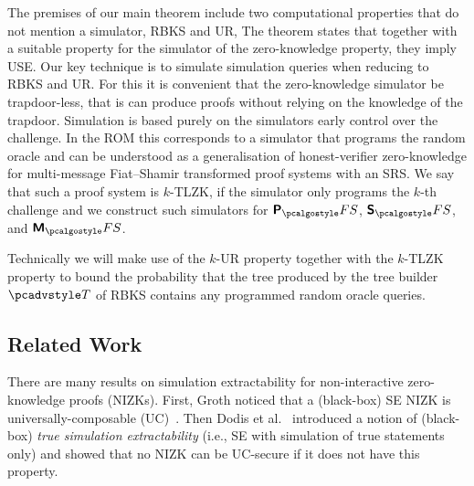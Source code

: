 The premises of our main theorem include two computational properties that do not mention a simulator, RBKS and UR, The theorem states that together with a suitable property for the simulator of the zero-knowledge property, they imply USE.
%
Our key technique is to simulate simulation queries when reducing to RBKS and UR. For this it is convenient that the zero-knowledge simulator be trapdoor-less, that is can produce proofs without relying on the
knowledge of the trapdoor. Simulation is based purely on the simulators early control over the challenge. 
%
In the ROM this corresponds to a simulator that programs the random oracle and can be understood as a generalisation of
honest-verifier zero-knowledge for multi-message Fiat--Shamir transformed proof systems with an
SRS. We say that such a proof system is $k$-TLZK, if the simulator only programs the $k$-th challenge and we construct such simulators for $\plonkprotfs$, $\sonicprotfs$, and $\marlinprotfs$. 





Technically we will make use of the $k$-UR property together with the $k$-TLZK property to bound the probability that the tree produced by the tree builder $\tdv$ of RBKS contains any programmed random oracle queries.

\subsection{Related Work}
There are many results on simulation extractability for
non-interactive zero-knowledge proofs (NIZKs). First, Groth \cite{AC:Groth07}
noticed that a (black-box) SE NIZK is
universally-composable (UC)~\cite{EPRINT:Canetti00}. Then Dodis et al.~\cite{AC:DHLW10} introduced a
notion of (black-box) \emph{true simulation extractability} (i.e., SE with simulation of true statements only) and showed that no
NIZK can be UC-secure if it does not have this property. 

